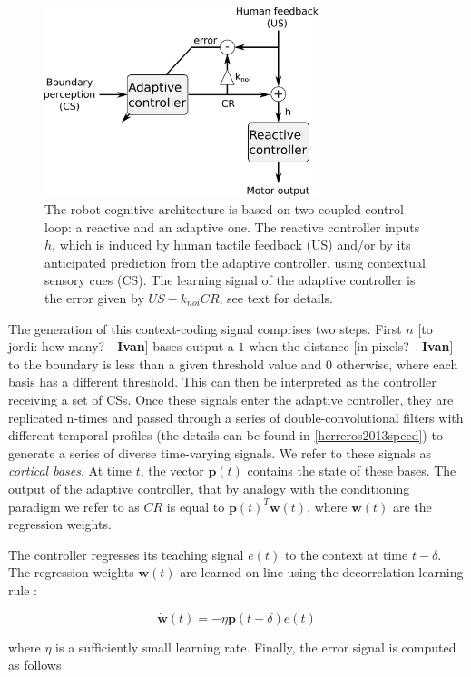 \documentclass[letterpaper, 10 pt, conference]{ieeeconf}  %
\newcommand\ih[1]{{\color{red}}{\color{red}}{\footnotesize \color{red}[#1 - \textbf{Ivan}]}} %
\begin{document}
\begin{figure}[!t]
\centering
\includegraphics[width=8cm]{architecture}
\caption{The robot cognitive architecture is based on two coupled control loop: a reactive and an adaptive one. The reactive controller inputs $h$, which is induced by human tactile feedback (US) and/or by its anticipated prediction from the adaptive controller, using contextual sensory cues (CS). The learning signal of the adaptive controller is the error given by $US - k_{noi}CR$, see text for details.}
\label{fig:architecture}
\end{figure}

The generation of this context-coding signal comprises two steps. First $n$ \ih{to jordi: how many?} bases output a $1$ when the distance \ih{in pixels?} to the boundary is less than a given threshold value and $0$ otherwise, where each basis has a different threshold. This can then be interpreted as the controller receiving a set of CSs. Once these signals enter the adaptive controller, they are replicated n-times and passed through a series of double-convolutional filters with different temporal profiles (the details can be found in \ref{herreros2013speed}) to generate a series of diverse time-varying signals. We refer to these signals as \emph{cortical bases}. At time $t$, the vector $\mathbf{p}(t)$ contains the state of these bases. The output of the adaptive controller, that by analogy with the conditioning paradigm we refer to as $CR$ is equal to $\mathbf{p}(t)^T \mathbf{w}(t)$, where $\mathbf{w}(t)$ are the regression weights.

The controller regresses its teaching signal $e(t)$ to the context at time $t-\delta$. The regression weights $\mathbf{w}(t)$ are learned on-line using the decorrelation learning rule \cite{fujita1982adaptive}:

\[
\dot{\mathbf{w}}(t) = -\eta \mathbf{p}(t-\delta) e(t)
\]

where $\eta$ is a sufficiently small learning rate. Finally, the error signal is computed as follows
\end{document}
